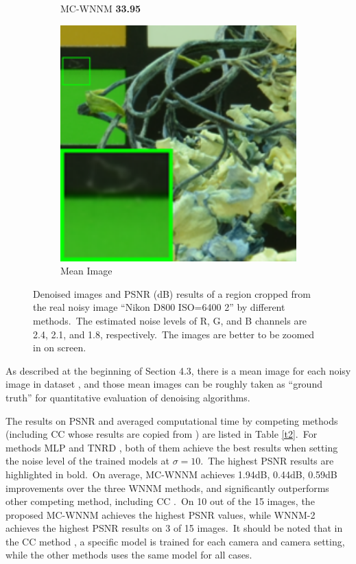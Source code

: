 \begin{figure}
\begin{subfigure}[t]{0.19\textwidth}
		\caption{MC-WNNM \textbf{33.95}}
    \end{subfigure}
    \hfill
    \begin{subfigure}[t]{0.19\textwidth}
        \centering
        \includegraphics[width=1\textwidth]{images/mcwnnm/cc/resize_br_d800_iso6400_2.png}
		\caption{Mean Image}
    \end{subfigure}
    \caption{Denoised images and PSNR (dB) results of a region cropped from the real noisy image ``Nikon D800 ISO=6400 2'' \cite{crosschannel2016} by different methods.\ The estimated noise levels of R, G, and B channels are 2.4, 2.1, and 1.8, respectively.\ The images are better to be zoomed in on screen.}
    \label{fig4-19}
\end{figure}


\quad As described at the beginning of Section 4.3, there is a mean image for each noisy image in dataset \cite{crosschannel2016}, and those mean images can be roughly taken as ``ground truth'' for quantitative evaluation of denoising algorithms.

The results on PSNR and averaged computational time by competing methods (including CC \cite{crosschannel2016} whose results are copied from \cite{crosschannel2016}) are listed in Table \ref{t2}.\ For methods MLP \cite{mlp} and TNRD \cite{chen2015learning}, both of them achieve the best results when setting the noise level of the trained models at $\sigma=10$.\ The highest PSNR results are highlighted in bold.\ On average, MC-WNNM achieves 1.94dB, 0.44dB, 0.59dB improvements over the three WNNM methods, and significantly outperforms other competing method, including CC \cite{crosschannel2016}.\ On 10 out of the 15 images, the proposed MC-WNNM achieves the highest PSNR values, while WNNM-2 achieves the highest PSNR results on 3 of 15 images.\ It should be noted that in the CC method \cite{crosschannel2016}, a specific model is trained for each camera and camera setting, while the other methods uses the same model for all cases. 

